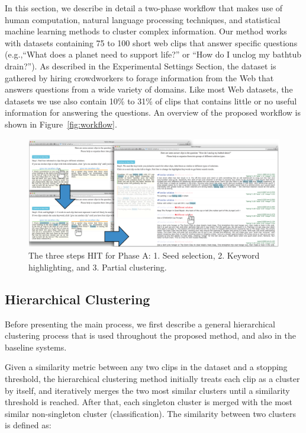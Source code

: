 

In this section, we describe in detail a two-phase workflow that makes use of
human computation, natural language processing techniques, and statistical
machine learning methods to cluster complex information. Our method works with
datasets containing 75 to 100 short web clips that answer specific questions
(e.g.,``What does a planet need to support life?'' or ``How do I unclog my
bathtub drain?''). As described in the Experimental Settings Section,
the dataset is gathered by hiring crowdworkers to forage information from the
Web that answers questions from a wide variety of domains. Like most Web
datasets, the datasets we use also contain 10\% to 31\% of clips that contains
little or no useful information for answering the questions. An overview of the
proposed workflow is shown in Figure~\ref{fig:workflow}.

\begin{figure}[!t]
	\centering
	\includegraphics[width=2.1\columnwidth]{images/raw-02.png}
	\caption{The three steps HIT for Phase A: 1. Seed selection, 2. Keyword
		highlighting, and 3. Partial clustering.}
	\label{fig:phase1-hit}
\end{figure}

\subsection{Hierarchical Clustering}
\label{sec:hclustering}
Before presenting the main process, we first describe a general hierarchical
clustering process that is used throughout the proposed method, and also in the
baseline systems.

Given a similarity metric between any two clips in the dataset and a stopping
threshold, the hierarchical clustering method initially treats each clip as 
a cluster by itself, and iteratively merges the two most similar clusters until a
similarity threshold is reached. After that, each singleton cluster is merged with
the most similar non-singleton cluster (classification). The similarity
between two clusters is defined as:

